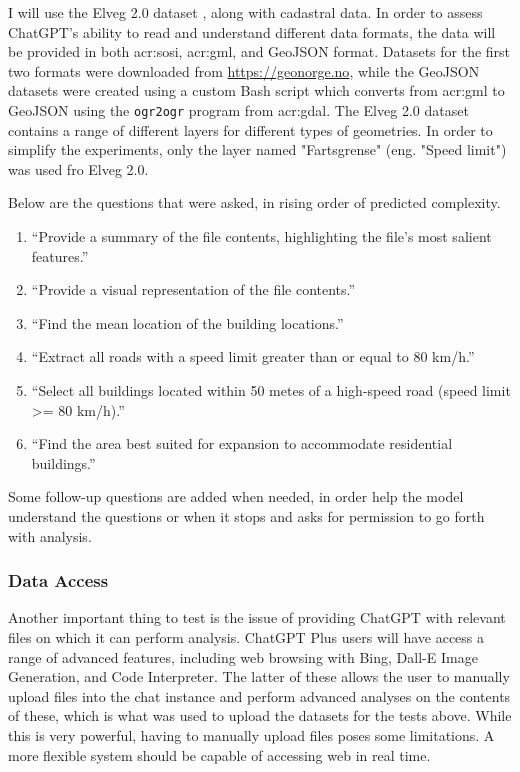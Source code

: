 I will use the Elveg 2.0 dataset \citep{thenorwegianmappingauthorityElveg2019}, along with cadastral data. In order to assess ChatGPT's ability to read and understand different data formats, the data will be provided in both \acrshort{acr:sosi}, \acrshort{acr:gml}, and GeoJSON format. Datasets for the first two formats were downloaded from \url{https://geonorge.no}, while the GeoJSON datasets were created using a custom Bash script which converts from \acrshort{acr:gml} to GeoJSON using the \texttt{ogr2ogr} program from \acrshort{acr:gdal}. The Elveg 2.0 dataset contains a range of different layers for different types of geometries. In order to simplify the experiments, only the layer named "Fartsgrense" (eng. "Speed limit") was used fro Elveg 2.0.

Below are the questions that were asked, in rising order of predicted complexity.

\begin{enumerate}
    \item \enquote{Provide a summary of the file contents, highlighting the file's most salient features.}
    \item \enquote{Provide a visual representation of the file contents.}
    \item \enquote{Find the mean location of the building locations.}
    \item \enquote{Extract all roads with a speed limit greater than or equal to 80 km/h.}
    \item \enquote{Select all buildings located within 50 metes of a high-speed road (speed limit >= 80 km/h).}
    \item \enquote{Find the area best suited for expansion to accommodate residential buildings.}
\end{enumerate}
\label{enum:gpt-gis-questions}

Some follow-up questions are added when needed, in order help the model understand the questions or when it stops and asks for permission to go forth with analysis.

\subsubsection{Data Access}

Another important thing to test is the issue of providing ChatGPT with relevant files on which it can perform analysis. ChatGPT Plus users will have access a range of advanced features, including web browsing with Bing, Dall-E Image Generation, and Code Interpreter. The latter of these allows the user to manually upload files into the chat instance and perform advanced analyses on the contents of these, which is what was used to upload the datasets for the tests above. While this is very powerful, having to manually upload files poses some limitations. A more flexible system should be capable of accessing web  in real time.

